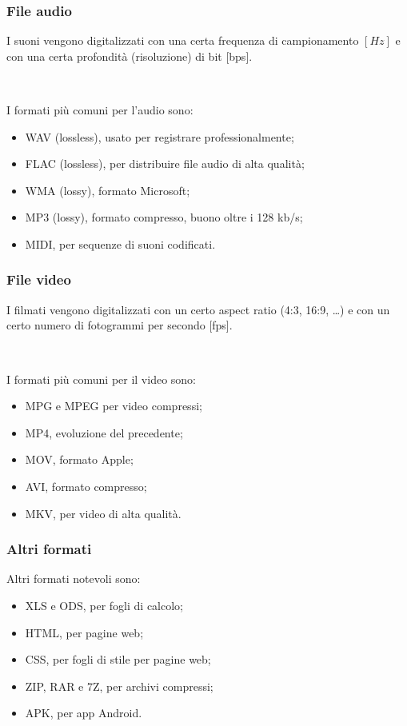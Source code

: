 \documentclass[]{beamer}
\begin{document}
\begin{frame}
\frametitle{File audio}
I suoni vengono digitalizzati con una certa \alert<1>{frequenza di campionamento} $ [Hz] $ e con una certa \alert<1>{profondità (risoluzione) di bit} [bps].\pause

~

I formati più comuni per l'audio sono:
\begin{itemize}
  \item WAV (lossless), usato per registrare professionalmente;\pause
  \item FLAC (lossless), per distribuire file audio di alta qualità;\pause
  \item WMA (lossy), formato Microsoft;\pause
  \item MP3 (lossy), formato compresso, buono oltre i 128 kb/s;\pause
  \item MIDI, per sequenze di suoni codificati.
\end{itemize}
\end{frame}


\begin{frame}
\frametitle{File video}
I filmati vengono digitalizzati con un certo \alert<1>{aspect ratio} (4:3, 16:9, \ldots) e con un certo numero di \alert<1>{fotogrammi per secondo} [fps].\pause

~

I formati più comuni per il video sono:
\begin{itemize}
  \item MPG e MPEG per video compressi;\pause
  \item MP4, evoluzione del precedente;\pause
  \item MOV, formato Apple;\pause
  \item AVI, formato compresso;\pause
  \item MKV, per video di alta qualità.
\end{itemize}
\end{frame}


\begin{frame}
\frametitle{Altri formati}
Altri formati notevoli sono:
\begin{itemize}
  \item XLS e ODS, per fogli di calcolo;\pause
  \item HTML, per pagine web;\pause
  \item CSS, per fogli di stile per pagine web;\pause
  \item ZIP, RAR e 7Z, per archivi compressi;\pause
  \item APK, per app Android.
\end{itemize}
\end{frame}
\end{document}
